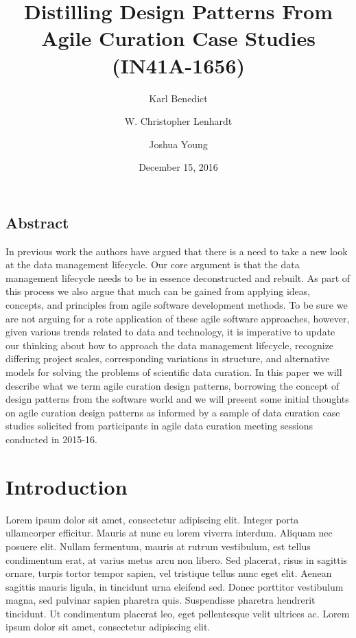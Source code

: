 \documentclass[final]{beamer}
\title
[American Geophysical Union Annual Meeting. San Francisco, CA. December
12-16, 2016.] %
{ %
Distilling Design Patterns From Agile Curation Case Studies (IN41A-1656)
}
\author{ %
Karl Benedict\inst{1} \and W. Christopher Lenhardt\inst{2} \and Joshua Young\inst{3}}
\institute{
\inst{1} University of New Mexico
\inst{2} Renaissance Computing Institute
\inst{3} University Corporation for Atmospheric Research
}
\date{December 15, 2016}
\begin{document}
\begin{frame}[t]
\begin{multicols}{3}


\subsection{Abstract}

In previous work the authors have argued that there is a need to take a
new look at the data management lifecycle. Our core argument is that the
data management lifecycle needs to be in essence deconstructed and
rebuilt. As part of this process we also argue that much can be gained
from applying ideas, concepts, and principles from agile software
development methods. To be sure we are not arguing for a rote
application of these agile software approaches, however, given various
trends related to data and technology, it is imperative to update our
thinking about how to approach the data management lifecycle, recognize
differing project scales, corresponding variations in structure, and
alternative models for solving the problems of scientific data curation.
In this paper we will describe what we term agile curation design
patterns, borrowing the concept of design patterns from the software
world and we will present some initial thoughts on agile curation design
patterns as informed by a sample of data curation case studies solicited
from participants in agile data curation meeting sessions conducted in
2015-16.






\section{Introduction}\label{introduction}

Lorem ipsum dolor sit amet, consectetur adipiscing elit. Integer porta
ullamcorper efficitur. Mauris at nunc eu lorem viverra interdum. Aliquam
nec posuere elit. Nullam fermentum, mauris at rutrum vestibulum, est
tellus condimentum erat, at varius metus arcu non libero. Sed placerat,
risus in sagittis ornare, turpis tortor tempor sapien, vel tristique
tellus nunc eget elit. Aenean sagittis mauris ligula, in tincidunt urna
eleifend sed. Donec porttitor vestibulum magna, sed pulvinar sapien
pharetra quis. Suspendisse pharetra hendrerit tincidunt. Ut condimentum
placerat leo, eget pellentesque velit ultrices ac. Lorem ipsum dolor sit
amet, consectetur adipiscing elit.


\end{multicols}
\end{frame}
\end{document}
